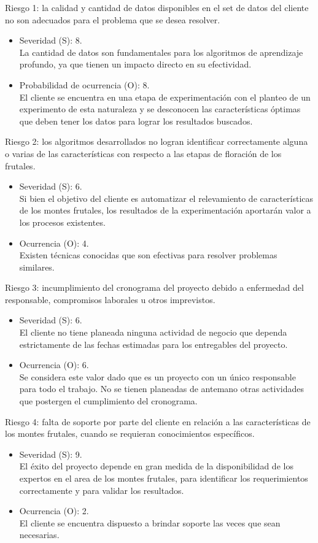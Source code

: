 \documentclass[
11pt, %
]{charter}
\begin{document}
Riesgo 1: la calidad y cantidad de datos disponibles en el set de datos del cliente no son
adecuados para el problema que se desea resolver.
\begin{itemize}
	\item Severidad (S): 8. \\
    La cantidad de datos son fundamentales para los algoritmos de aprendizaje profundo, ya
    que tienen un impacto directo en su efectividad.
	\item Probabilidad de ocurrencia (O): 8. \\
	El cliente se encuentra en una etapa de experimentación con el planteo de un experimento de esta naturaleza y se desconocen
    las características óptimas que deben tener los datos para lograr los resultados
    buscados.
\end{itemize}   

Riesgo 2: los algoritmos desarrollados no logran identificar correctamente alguna o varias de las características
con respecto a las etapas de floración de los frutales.
\begin{itemize}
	\item Severidad (S): 6.\\
	Si bien el objetivo del cliente es automatizar el relevamiento de características de
    los montes frutales, los resultados de la experimentación aportarán valor a los procesos existentes.
	\item Ocurrencia (O): 4.\\
	Existen técnicas conocidas que son efectivas para resolver problemas similares.
\end{itemize}

Riesgo 3: incumplimiento del cronograma del proyecto debido a enfermedad del responsable,
compromisos laborales u otros imprevistos.
\begin{itemize}
	\item Severidad (S):  6.\\
	El cliente no tiene planeada ninguna actividad de negocio que dependa estrictamente de
    las fechas estimadas para los entregables del proyecto.
	\item Ocurrencia (O): 6.\\
	Se considera este valor dado que es un proyecto con un único responsable para todo el
    trabajo. No se tienen planeadas de antemano otras actividades que postergen el cumplimiento del cronograma.
\end{itemize}

Riesgo 4: falta de soporte por parte del cliente en relación a las características de los montes frutales, cuando
se requieran conocimientos específicos.
\begin{itemize}
	\item Severidad (S):  9.\\
	El éxito del proyecto depende en gran medida de la disponibilidad de los expertos en el
    area de los montes frutales, para identificar los requerimientos
    correctamente y para validar los resultados.
	\item Ocurrencia (O): 2.\\
	El cliente se encuentra dispuesto a brindar soporte las veces que sean necesarias.
\end{itemize}
\end{document}
